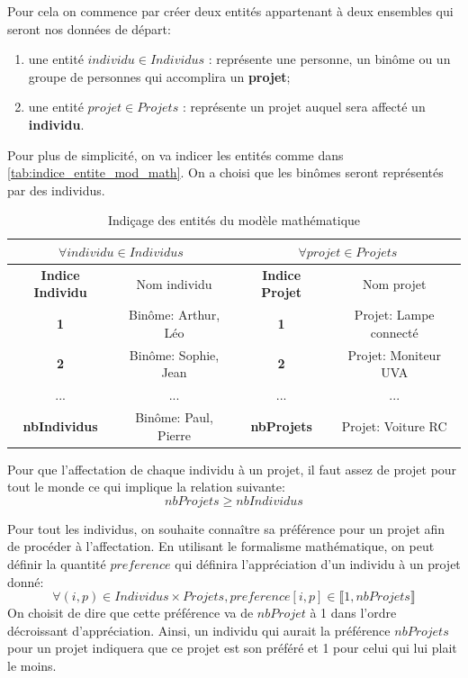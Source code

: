 \documentclass[final,poster]{polytech/polytech}
\begin{document}
Pour cela on commence par créer deux entités appartenant à deux ensembles qui seront nos données de départ:
\begin{enumerate}
\item une entité $individu \in Individus$ : représente une personne, un binôme ou un groupe de personnes qui accomplira un \textbf{projet};
\item une entité  $projet \in Projets$ : représente un projet auquel sera affecté un \textbf{individu}.
\end{enumerate}

Pour plus de simplicité, on va indicer les entités comme dans \autoref{tab:indice_entite_mod_math}. On a choisi que les binômes seront représentés par des individus.
\begin{table}
\caption{\label{tab:indice_entite_mod_math}Indiçage des entités du modèle mathématique}
\begin{tabular}{|c|c|c|c|}
\hline
\multicolumn{2}{|c|}{$\forall individu \in Individus$} & \multicolumn{2}{|c|}{$\forall projet \in Projets$} \\
\hline
\textbf{Indice Individu} & Nom individu &\textbf{ Indice Projet} & Nom projet \\
\hline
\textbf{1} & Binôme: Arthur, Léo & \textbf{1} & Projet: Lampe connecté \\
\hline
\textbf{2} & Binôme: Sophie, Jean & \textbf{2} & Projet: Moniteur UVA \\
\hline
... & ... & ... & ... \\
\hline
\textbf{nbIndividus} & Binôme: Paul, Pierre &\textbf{ nbProjets} & Projet: Voiture RC \\
\hline
\end{tabular}
\end{table}

Pour que l'affectation de chaque individu à un projet, il faut assez de projet pour tout le monde ce qui implique la relation suivante:
$$ nbProjets \geqslant nbIndividus$$

Pour tout les individus, on souhaite connaître sa préférence pour un projet afin de procéder à l'affectation. En utilisant le formalisme mathématique, on peut définir la quantité $preference$ qui définira l'appréciation d'un individu à un projet donné:
$$
\forall (i,p) \in Individus \times Projets,
preference[i,p] \in \llbracket 1, nbProjets \rrbracket
$$
On choisit de dire que cette préférence va de $nbProjet$ à 1 dans l'ordre décroissant d'appréciation. Ainsi, un individu qui aurait la préférence $nbProjets$ pour un projet indiquera que ce projet est son préféré et 1 pour celui qui lui plait le moins.
\end{document}
